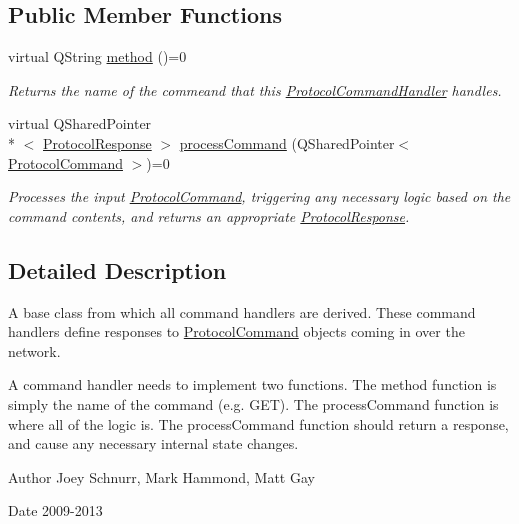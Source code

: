 \subsection*{Public Member Functions}
\begin{DoxyCompactItemize}
\item 
\hypertarget{struct_picto_1_1_protocol_command_handler_a6516aa6b20f7e849c04f211de99b5c58}{virtual Q\-String \hyperlink{struct_picto_1_1_protocol_command_handler_a6516aa6b20f7e849c04f211de99b5c58}{method} ()=0}\label{struct_picto_1_1_protocol_command_handler_a6516aa6b20f7e849c04f211de99b5c58}

\begin{DoxyCompactList}\small\item\em Returns the name of the commeand that this \hyperlink{struct_picto_1_1_protocol_command_handler}{Protocol\-Command\-Handler} handles. \end{DoxyCompactList}\item 
\hypertarget{struct_picto_1_1_protocol_command_handler_aeeaa16fe40f10fd55996d74e16e29cad}{virtual Q\-Shared\-Pointer\\*
$<$ \hyperlink{struct_picto_1_1_protocol_response}{Protocol\-Response} $>$ \hyperlink{struct_picto_1_1_protocol_command_handler_aeeaa16fe40f10fd55996d74e16e29cad}{process\-Command} (Q\-Shared\-Pointer$<$ \hyperlink{struct_picto_1_1_protocol_command}{Protocol\-Command} $>$)=0}\label{struct_picto_1_1_protocol_command_handler_aeeaa16fe40f10fd55996d74e16e29cad}

\begin{DoxyCompactList}\small\item\em Processes the input \hyperlink{struct_picto_1_1_protocol_command}{Protocol\-Command}, triggering any necessary logic based on the command contents, and returns an appropriate \hyperlink{struct_picto_1_1_protocol_response}{Protocol\-Response}. \end{DoxyCompactList}\end{DoxyCompactItemize}


\subsection{Detailed Description}
A base class from which all command handlers are derived. These command handlers define responses to \hyperlink{struct_picto_1_1_protocol_command}{Protocol\-Command} objects coming in over the network. 

A command handler needs to implement two functions. The method function is simply the name of the command (e.\-g. G\-E\-T). The process\-Command function is where all of the logic is. The process\-Command function should return a response, and cause any necessary internal state changes. \begin{DoxyAuthor}{Author}
Joey Schnurr, Mark Hammond, Matt Gay 
\end{DoxyAuthor}
\begin{DoxyDate}{Date}
2009-\/2013 
\end{DoxyDate}


